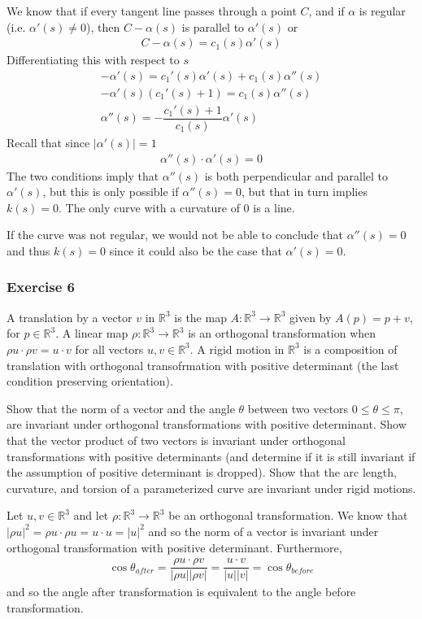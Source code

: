 \documentclass{article}
\newcommand{\R}{\mathbb{R}}
\begin{document}
	We know that if every tangent line passes through a point $C$, and if $\alpha$ is regular (i.e. $\alpha'(s) \neq 0$), then $C - \alpha(s)$ is parallel to $\alpha'(s)$ or
	\begin{gather*}
		C - \alpha(s) = c_1(s) \alpha'(s)
	\end{gather*}
	Differentiating this with respect to $s$
	\begin{gather*}
		-\alpha'(s) = c_1'(s) \alpha'(s) + c_1(s) \alpha''(s) \\
		-\alpha'(s) \left( c_1'(s) + 1 \right) = c_1(s) \alpha''(s) \\
		\alpha''(s) = -\dfrac{c_1'(s) + 1}{c_1(s)} \alpha'(s)
	\end{gather*}
	Recall that since $|\alpha'(s)| = 1$
	\begin{gather*}
		\alpha''(s) \cdot \alpha'(s) = 0
	\end{gather*}
	The two conditions imply that $\alpha''(s)$ is both perpendicular and parallel to $\alpha'(s)$, but this is only possible if $\alpha''(s) = 0$, but that in turn implies $k(s) = 0$. The only curve with a curvature of 0 is a line.
	
	If the curve was not regular, we would not be able to conclude that $\alpha''(s) = 0$ and thus $k(s) = 0$ since it could also be the case that $\alpha'(s) = 0$.
	
	\subsubsection*{Exercise 6}
	A translation by a vector $v$ in $\R^3$ is the map $A : \R^3 \to \R^3$ given by $A(p) = p + v$, for $p \in \R^3$. A linear map $\rho : \R^3 \to \R^3$ is an orthogonal transformation when $\rho u \cdot \rho v = u \cdot v$ for all vectors $u, v \in \R^3$. A rigid motion in $\R^3$ is a composition of translation with orthogonal transofrmation with positive determinant (the last condition preserving orientation).
	
	Show that the norm of a vector and the angle $\theta$ between two vectors $0 \leq \theta \leq \pi$, are invariant under orthogonal transformations with positive determinant. Show that the vector product of two vectors is invariant under orthogonal transformations with positive determinants (and determine if it is still invariant if the assumption of positive determinant is dropped). Show that the arc length, curvature, and torsion of a parameterized curve are invariant under rigid motions.
	
	Let $u, v \in \R^3$ and let $\rho : \R^3 \to \R^3$ be an orthogonal transformation. We know that $|\rho u|^2 = \rho u \cdot \rho u = u \cdot u = |u|^2$ and so the norm of a vector is invariant under orthogonal transformation with positive determinant. Furthermore,
	\begin{gather*}
		\cos \theta_{after} = \dfrac{\rho u \cdot \rho v}{|\rho u||\rho v|} = \dfrac{u \cdot v}{|u||v|} = \cos \theta_{before}
	\end{gather*}
	and so the angle after transformation is equivalent to the angle before transformation.
	
\end{document}
